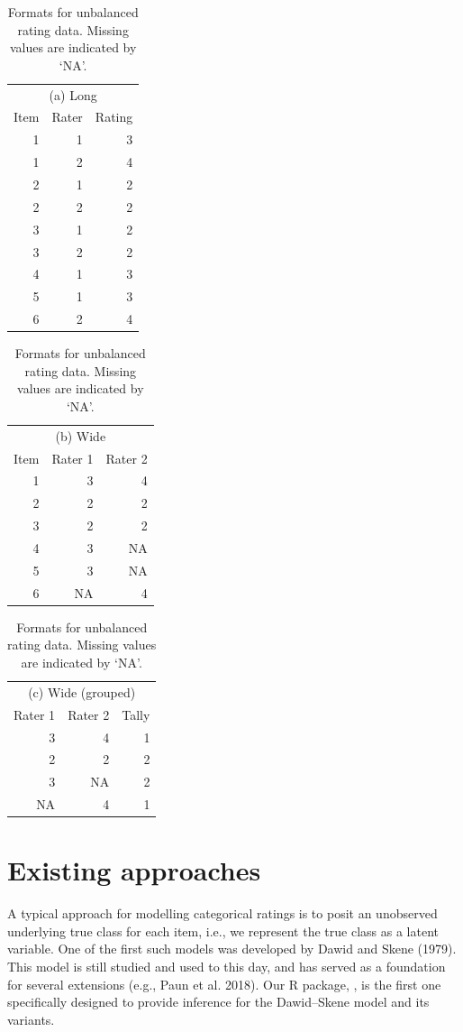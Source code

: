 \begin{table}
\caption{\label{tab:data-formats-unbalanced}Formats for unbalanced rating data. Missing values are indicated by ‘NA’.}

\begin{tabular}{r|r|r}
\hline
\multicolumn{3}{c}{(a) Long} \\
\cline{1-3}
Item & Rater & Rating\\
\hline
1 & 1 & 3\\
\hline
1 & 2 & 4\\
\hline
2 & 1 & 2\\
\hline
2 & 2 & 2\\
\hline
3 & 1 & 2\\
\hline
3 & 2 & 2\\
\hline
4 & 1 & 3\\
\hline
5 & 1 & 3\\
\hline
6 & 2 & 4\\
\hline
\end{tabular}
\begin{tabular}{r|r|r}
\hline
\multicolumn{3}{c}{(b) Wide} \\
\cline{1-3}
Item & Rater 1 & Rater 2\\
\hline
1 & 3 & 4\\
\hline
2 & 2 & 2\\
\hline
3 & 2 & 2\\
\hline
4 & 3 & NA\\
\hline
5 & 3 & NA\\
\hline
6 & NA & 4\\
\hline
\end{tabular}
\begin{tabular}{r|r|r}
\hline
\multicolumn{3}{c}{(c) Wide (grouped)} \\
\cline{1-3}
Rater 1 & Rater 2 & Tally\\
\hline
3 & 4 & 1\\
\hline
2 & 2 & 2\\
\hline
3 & NA & 2\\
\hline
NA & 4 & 1\\
\hline
\end{tabular}
\end{table}

\hypertarget{sec:existing-approaches}{%
\section{Existing approaches}\label{sec:existing-approaches}}

A typical approach for modelling categorical ratings is to posit an unobserved underlying
true class for each item, i.e., we represent the true class as
a latent variable. One of the first such models was developed by
Dawid and Skene (1979). This model is still studied and used to this day, and has
served as a foundation for several extensions (e.g., Paun et al. 2018). Our
R package, , is the first one specifically designed to provide
inference for the Dawid--Skene model and its variants.

